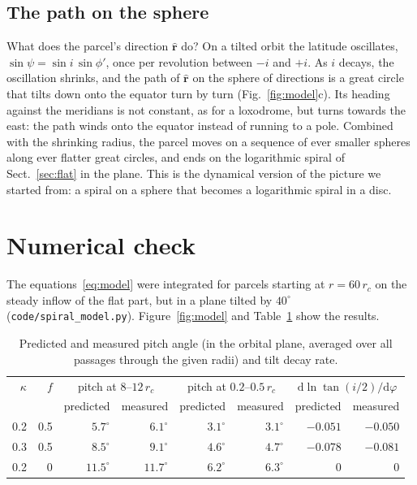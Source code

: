 \documentclass[11pt,a4paper]{article}
\newcommand{\dd}{\mathrm{d}}
\newcommand{\rc}{r_c}
\begin{document}
\subsection{The path on the sphere}
What does the parcel's direction $\hat{\mathbf r}$ do? On a tilted orbit the latitude
oscillates, $\sin\psi=\sin i\,\sin\phi'$, once per revolution between $-i$ and $+i$.
As $i$ decays, the oscillation shrinks, and the path of $\hat{\mathbf r}$ on the
sphere of directions is a great circle that tilts down onto the equator turn by turn
(Fig.~\ref{fig:model}c). Its heading against the meridians is not constant, as for a
loxodrome, but turns towards the east: the path winds onto the equator instead of
running to a pole. Combined with the shrinking radius, the parcel moves on a sequence
of ever smaller spheres along ever flatter great circles, and ends on the logarithmic
spiral of Sect.~\ref{sec:flat} in the plane. This is the dynamical version of the
picture we started from: a spiral on a sphere that becomes a logarithmic spiral in a
disc.

\section{Numerical check}

The equations~\eqref{eq:model} were integrated for parcels starting at $r=60\,\rc$
on the steady inflow of the flat part, but in a plane tilted by $40^\circ$
(\texttt{code/spiral\_model.py}). Figure~\ref{fig:model} and Table~\ref{tab:num} show the
results.

\begin{table}[h]
\centering\small
\caption{Predicted and measured pitch angle (in the orbital plane, averaged over
all passages through the given radii) and tilt decay rate.}
\label{tab:num}
\begin{tabular}{rrrrrrrr}
\toprule
$\kappa$ & $f$ & \multicolumn{2}{c}{pitch at $8$--$12\,\rc$} &
\multicolumn{2}{c}{pitch at $0.2$--$0.5\,\rc$} & \multicolumn{2}{c}{$\dd\ln\tan(i/2)/\dd\varphi$}\\
 & & predicted & measured & predicted & measured & predicted & measured\\
\midrule
0.2 & 0.5 & $5.7^\circ$ & $6.1^\circ$ & $3.1^\circ$ & $3.1^\circ$ & $-0.051$ & $-0.050$\\
0.3 & 0.5 & $8.5^\circ$ & $9.1^\circ$ & $4.6^\circ$ & $4.7^\circ$ & $-0.078$ & $-0.081$\\
0.2 & 0 & $11.5^\circ$ & $11.7^\circ$ & $6.2^\circ$ & $6.3^\circ$ & 0 & 0\\
\bottomrule
\end{tabular}
\end{table}
\end{document}
